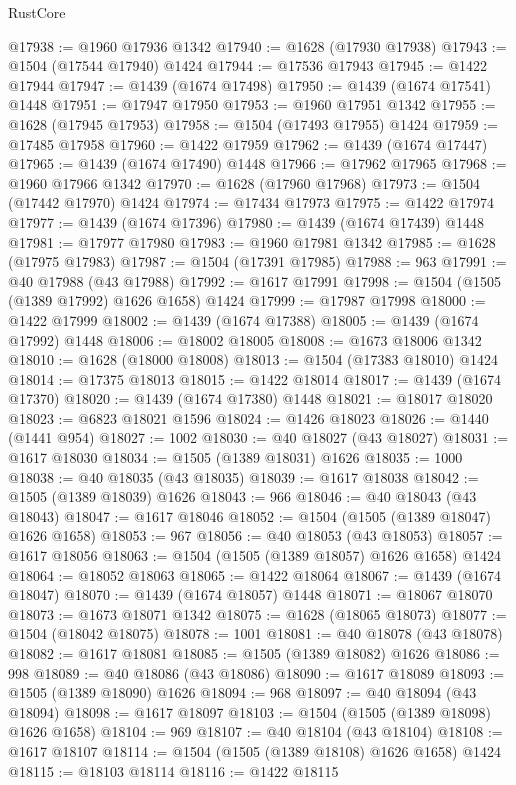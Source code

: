 \begin{lexlean}{RustCore}
\begin{coremodule}
@17938 := @1960 @17936 @1342
@17940 := @1628 (@17930 @17938)
@17943 := @1504 (@17544 @17940) @1424
@17944 := @17536 @17943
@17945 := @1422 @17944
@17947 := @1439 (@1674 @17498)
@17950 := @1439 (@1674 @17541) @1448
@17951 := @17947 @17950
@17953 := @1960 @17951 @1342
@17955 := @1628 (@17945 @17953)
@17958 := @1504 (@17493 @17955) @1424
@17959 := @17485 @17958
@17960 := @1422 @17959
@17962 := @1439 (@1674 @17447)
@17965 := @1439 (@1674 @17490) @1448
@17966 := @17962 @17965
@17968 := @1960 @17966 @1342
@17970 := @1628 (@17960 @17968)
@17973 := @1504 (@17442 @17970) @1424
@17974 := @17434 @17973
@17975 := @1422 @17974
@17977 := @1439 (@1674 @17396)
@17980 := @1439 (@1674 @17439) @1448
@17981 := @17977 @17980
@17983 := @1960 @17981 @1342
@17985 := @1628 (@17975 @17983)
@17987 := @1504 (@17391 @17985)
@17988 := 963
@17991 := @40 @17988 (@43 @17988)
@17992 := @1617 @17991
@17998 := @1504 (@1505 (@1389 @17992) @1626 @1658) @1424
@17999 := @17987 @17998
@18000 := @1422 @17999
@18002 := @1439 (@1674 @17388)
@18005 := @1439 (@1674 @17992) @1448
@18006 := @18002 @18005
@18008 := @1673 @18006 @1342
@18010 := @1628 (@18000 @18008)
@18013 := @1504 (@17383 @18010) @1424
@18014 := @17375 @18013
@18015 := @1422 @18014
@18017 := @1439 (@1674 @17370)
@18020 := @1439 (@1674 @17380) @1448
@18021 := @18017 @18020
@18023 := @6823 @18021 @1596
@18024 := @1426 @18023
@18026 := @1440 (@1441 @954)
@18027 := 1002
@18030 := @40 @18027 (@43 @18027)
@18031 := @1617 @18030
@18034 := @1505 (@1389 @18031) @1626
@18035 := 1000
@18038 := @40 @18035 (@43 @18035)
@18039 := @1617 @18038
@18042 := @1505 (@1389 @18039) @1626
@18043 := 966
@18046 := @40 @18043 (@43 @18043)
@18047 := @1617 @18046
@18052 := @1504 (@1505 (@1389 @18047) @1626 @1658)
@18053 := 967
@18056 := @40 @18053 (@43 @18053)
@18057 := @1617 @18056
@18063 := @1504 (@1505 (@1389 @18057) @1626 @1658) @1424
@18064 := @18052 @18063
@18065 := @1422 @18064
@18067 := @1439 (@1674 @18047)
@18070 := @1439 (@1674 @18057) @1448
@18071 := @18067 @18070
@18073 := @1673 @18071 @1342
@18075 := @1628 (@18065 @18073)
@18077 := @1504 (@18042 @18075)
@18078 := 1001
@18081 := @40 @18078 (@43 @18078)
@18082 := @1617 @18081
@18085 := @1505 (@1389 @18082) @1626
@18086 := 998
@18089 := @40 @18086 (@43 @18086)
@18090 := @1617 @18089
@18093 := @1505 (@1389 @18090) @1626
@18094 := 968
@18097 := @40 @18094 (@43 @18094)
@18098 := @1617 @18097
@18103 := @1504 (@1505 (@1389 @18098) @1626 @1658)
@18104 := 969
@18107 := @40 @18104 (@43 @18104)
@18108 := @1617 @18107
@18114 := @1504 (@1505 (@1389 @18108) @1626 @1658) @1424
@18115 := @18103 @18114
@18116 := @1422 @18115

\end{coremodule}
\end{lexlean}
